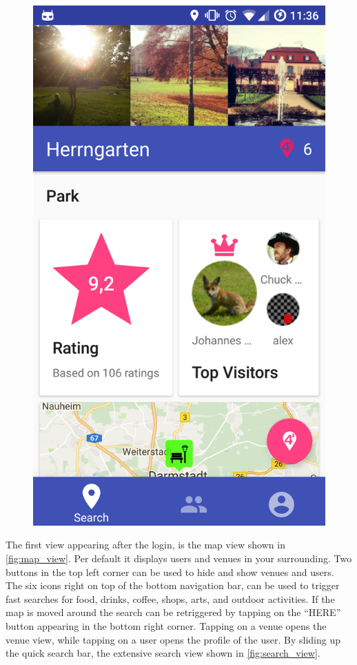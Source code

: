 \documentclass[11pt, accentcolor=tud1c]{tudreport}
\begin{document}
\begin{figure}[h]
\begin{minipage}{.3\textwidth}
  \includegraphics[width=.8\linewidth]{./res/venue.png}
  \label{fig:venue_view}
\end{minipage}%
\end{figure}

The first view appearing after the login, is the map view shown in \autoref{fig:map_view}. Per default it displays users and venues in your surrounding. Two buttons in the top left corner can be used to hide and show venues and users. The six icons right on top of the bottom navigation bar, can be used to trigger fast searches for food, drinks, coffee, shops, arts, and outdoor activities. If the map is moved around the search can be retriggered by tapping on the ``HERE'' button appearing in the bottom right corner.
Tapping on a venue opens the venue view, while tapping on a user opens the profile of the user. 
By sliding up the quick search bar, the extensive search view shown in \autoref{fig:search_view}.
\end{document}
